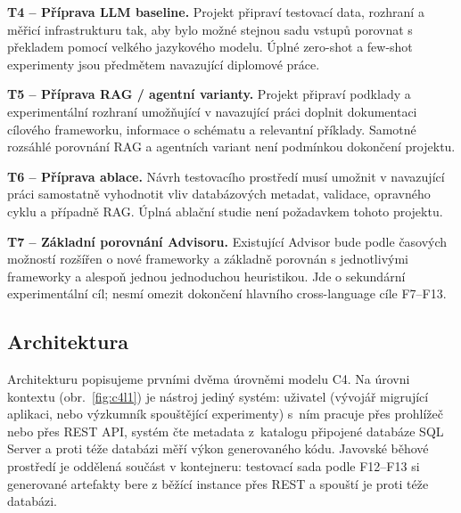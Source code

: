 \documentclass{article}
\begin{document}
\textbf{T4 -- Příprava LLM baseline.} Projekt připraví testovací data, rozhraní a měřicí infrastrukturu tak, aby bylo možné stejnou sadu vstupů porovnat s překladem pomocí velkého jazykového modelu. Úplné zero-shot a few-shot experimenty jsou předmětem navazující diplomové práce.

\textbf{T5 -- Příprava RAG / agentní varianty.} Projekt připraví podklady a experimentální rozhraní umožňující v navazující práci doplnit dokumentaci cílového frameworku, informace o schématu a relevantní příklady. Samotné rozsáhlé porovnání RAG a agentních variant není podmínkou dokončení projektu.

\textbf{T6 -- Příprava ablace.} Návrh testovacího prostředí musí umožnit v navazující práci samostatně vyhodnotit vliv databázových metadat, validace, opravného cyklu a případně RAG. Úplná ablační studie není požadavkem tohoto projektu.

\textbf{T7 -- Základní porovnání Advisoru.} Existující Advisor bude podle časových možností rozšířen o nové frameworky a základně porovnán s jednotlivými frameworky a alespoň jednou jednoduchou heuristikou. Jde o sekundární experimentální cíl; nesmí omezit dokončení hlavního cross-language cíle F7--F13.

\subsection{Architektura}

Architekturu popisujeme prvními dvěma úrovněmi modelu C4. Na úrovni kontextu (obr.~\ref{fig:c4l1}) je nástroj jediný systém: uživatel (vývojář migrující aplikaci, nebo výzkumník spouštějící experimenty) s~ním pracuje přes prohlížeč nebo přes REST API, systém čte metadata z~katalogu připojené databáze SQL Server a proti téže databázi měří výkon generovaného kódu. Javovské běhové prostředí je oddělená součást v kontejneru: testovací sada podle F12–F13 si generované artefakty bere z běžící instance přes REST a spouští je proti téže databázi.
\end{document}
